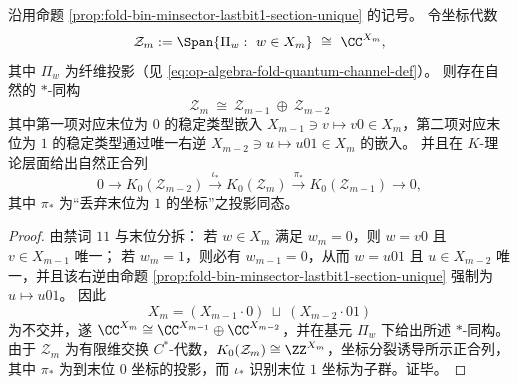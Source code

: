 \begin{corollary}\label{cor:fold-stable-type-coordinate-algebra-fibonacci-splitting}
沿用命题 \ref{prop:fold-bin-minsector-lastbit1-section-unique} 的记号。
令坐标代数
\[
\mathcal{Z}_m:=\Span\{\Pi_w:\ w\in X_m\}\ \cong\ \CC^{X_m},
\]
其中 \(\Pi_w\) 为纤维投影（见 \eqref{eq:op-algebra-fold-quantum-channel-def}）。
则存在自然的 \(\ast\)-同构
\[
\boxed{\;\mathcal{Z}_m\ \cong\ \mathcal{Z}_{m-1}\ \oplus\ \mathcal{Z}_{m-2}\;}
\]
其中第一项对应末位为 \(0\) 的稳定类型嵌入 \(X_{m-1}\ni v\mapsto v0\in X_m\)，第二项对应末位为 \(1\) 的稳定类型通过唯一右逆 \(X_{m-2}\ni u\mapsto u01\in X_m\) 的嵌入。
并且在 \(K\)-理论层面给出自然正合列
\[
0\longrightarrow K_0(\mathcal{Z}_{m-2})\xrightarrow{\ \iota_\ast\ }K_0(\mathcal{Z}_m)\xrightarrow{\ \pi_\ast\ }K_0(\mathcal{Z}_{m-1})\longrightarrow 0,
\]
其中 \(\pi_\ast\) 为“丢弃末位为 \(1\) 的坐标”之投影同态。
\end{corollary}
\begin{proof}
由禁词 \(11\) 与末位分拆：
若 \(w\in X_m\) 满足 \(w_m=0\)，则 \(w=v0\) 且 \(v\in X_{m-1}\) 唯一；
若 \(w_m=1\)，则必有 \(w_{m-1}=0\)，从而 \(w=u01\) 且 \(u\in X_{m-2}\) 唯一，并且该右逆由命题 \ref{prop:fold-bin-minsector-lastbit1-section-unique} 强制为 \(u\mapsto u01\)。
因此
\[
X_m=(X_{m-1}\cdot 0)\ \sqcup\ (X_{m-2}\cdot 01)
\]
为不交并，遂 \(\CC^{X_m}\cong \CC^{X_{m-1}}\oplus \CC^{X_{m-2}}\)，并在基元 \(\Pi_w\) 下给出所述 \(\ast\)-同构。
由于 \(\mathcal{Z}_m\) 为有限维交换 \(C^\ast\)-代数，\(K_0(\mathcal{Z}_m)\cong \ZZ^{X_m}\)，坐标分裂诱导所示正合列，其中 \(\pi_\ast\) 为到末位 \(0\) 坐标的投影，而 \(\iota_\ast\) 识别末位 \(1\) 坐标为子群。证毕。
\end{proof}
